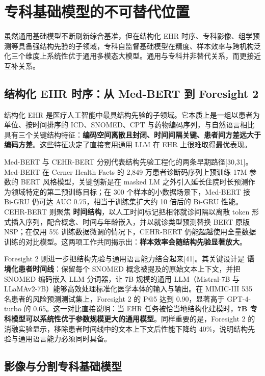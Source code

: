 \section{专科基础模型的不可替代位置}

虽然通用基础模型不断刷新综合基准，但在结构化 EHR 时序、专科影像、组学预测等具备强结构先验的子领域，专科自监督基础模型在精度、样本效率与跨机构泛化三个维度上系统性优于通用多模态大模型。通用与专科并非替代关系，而更接近互补关系。

\subsection{结构化 EHR 时序：从 Med-BERT 到 Foresight 2}

结构化 EHR 是医疗人工智能中最具结构先验的子领域。它本质上是一组以患者为单位、按时间排序的 ICD、SNOMED、CPT 与药物编码序列，与自然语言相比具有三个关键结构特征：\textbf{编码空间离散且封闭、时间间隔关键、患者间方差远大于编码方差}。这些特征决定了直接套用通用 LLM 在 EHR 上很难取得最优表现。

Med-BERT 与 CEHR-BERT 分别代表结构先验工程化的两条早期路径[30,31]。Med-BERT 在 Cerner Health Facts 的 2,849 万患者诊断码序列上预训练 17M 参数的 BERT 风格模型，关键创新是在 masked LM 之外引入延长住院时长预测作为领域特定的第二预训练目标；在 300 个样本的小数据场景下，Med-BERT 接 Bi-GRU 仍可达 AUC 0.75，相当于训练集扩大约 10 倍后的 Bi-GRU 性能。CEHR-BERT 则聚焦 \textbf{时间结构}，以人工时间标记把相邻就诊间隔以离散 token 形式插入序列，配合概念、时间与年龄嵌入，并以就诊类型预测替换 BERT 原版 NSP；在仅用 5\% 训练数据微调的情况下，CEHR-BERT 仍能超越使用全量数据训练的对比模型。这两项工作共同揭示出：\textbf{样本效率会随结构先验显著放大}。

Foresight 2 则进一步把结构先验与通用语言能力结合起来[41]。其关键设计是 \textbf{语境化患者时间线}：保留每个 SNOMED 概念被提及的原始文本上下文，并把 SNOMED 编码嵌入 LLM 分词器，让 7B 规模的通用 LLM（Mistral-7B 与 LLaMAv2-7B）能够高效处理标准化医学本体的输入与输出。在 MIMIC-III 535 名患者的风险预测测试集上，Foresight 2 的 P@5 达到 0.90，显著高于 GPT-4-turbo 的 0.65。这一对比直接说明：当 EHR 任务被恰当地结构化建模时，\textbf{7B 专科模型可以系统性优于参数规模更大的通用模型}。同样重要的是，Foresight 2 的消融实验显示，移除患者时间线中的文本上下文后性能下降约 40\%，说明结构先验与通用语言能力必须同时具备。

\subsection{影像与分割专科基础模型}

